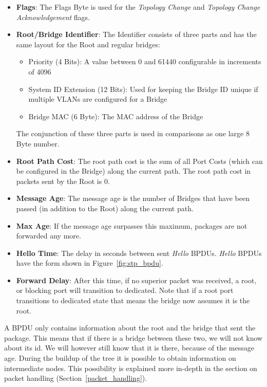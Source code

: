 \begin{itemize}
    \item \textbf{Flags}: The Flags Byte is used for the \textit{Topology Change} and \textit{Topology Change Acknowledgement} flags.
    \item \textbf{Root/Bridge Identifier}: The Identifier consists of three parts and has the same layout for the Root and regular bridges:
        \begin{itemize}
            \item Priority (4 Bits): A value between 0 and 61440 configurable in increments of 4096
            \item System ID Extension (12 Bits): Used for keeping the Bridge ID unique if multiple VLANs are configured for a Bridge
            \item Bridge MAC (6 Byte): The MAC address of the Bridge
        \end{itemize}
        The conjunction of these three parts is used in comparisons as one large 8 Byte number.
    \item \textbf{Root Path Cost}: The root path cost is the sum of all Port Costs (which can be configured in the Bridge) along the current path. The root path cost in packets sent by the Root is 0.
    \item \textbf{Message Age}: The message age is the number of Bridges that have been passed (in addition to the Root) along the current path.
    \item \textbf{Max Age}: If the message age surpasses this maximum, packages are not forwarded any more.
    \item \textbf{Hello Time}: The delay in seconds between sent \textit{Hello} BPDUs.
        \textit{Hello} BPDUs have the form shown in Figure~\ref{fig:stp_bpdu}.
    \item \textbf{Forward Delay}: After this time, if no superior packet was received, a root, or blocking port will transition to dedicated.
        Note that if a root port transitions to dedicated state that means the bridge now assumes it is the root.
\end{itemize}
A BPDU only contains information about the root and the bridge that sent the package.
This means that if there is a bridge between these two, we will not know about its id.
We will however still know that it is there, because of the message age.
During the buildup of the tree it is possible to obtain information on intermediate nodes.
This possibility is explained more in-depth in the section on packet handling (Section~\ref{packet_handling}).

